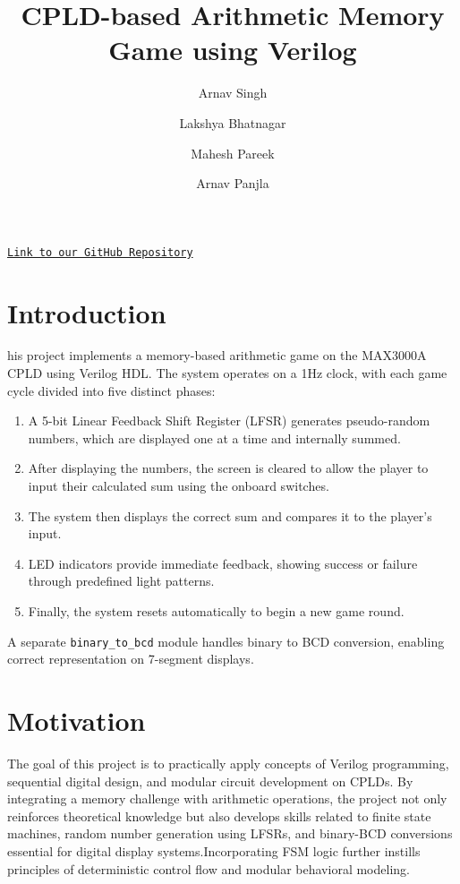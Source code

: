 \documentclass[10pt,a4paper,twocolumn,twoside]{tau-class/tau}
\title{CPLD-based Arithmetic Memory Game using Verilog}
\author[a]{Arnav Singh}
\author[b]{Lakshya Bhatnagar}
\author[c]{Mahesh Pareek}
\author[d]{Arnav Panjla}
\affil[a]{Arnav Singh, 2023EE10968}
\affil[b]{Lakshya Bhatnagar, 2023AM10945}
\affil[c]{Mahesh Pareek, 2023MT10586}
\affil[d]{Arnav Panjla, 2023EE10978}
\begin{document}
		
    \maketitle 
    \thispagestyle{firststyle} 
    \tauabstract 
    
\noindent\hfill \href{https://github.com/Arnav-panjla/CPLD_meth_game}{\texttt{Link to our GitHub Repository}}

\section{Introduction}

    his project implements a memory-based arithmetic game on the MAX3000A CPLD using Verilog HDL. The system operates on a 1Hz clock, with each game cycle divided into five distinct phases:
    
    \begin{enumerate}
        \item A 5-bit Linear Feedback Shift Register (LFSR) generates pseudo-random numbers, which are displayed one at a time and internally summed.
        \item After displaying the numbers, the screen is cleared to allow the player to input their calculated sum using the onboard switches.
        \item The system then displays the correct sum and compares it to the player's input.
        \item LED indicators provide immediate feedback, showing success or failure through predefined light patterns.
        \item Finally, the system resets automatically to begin a new game round.
    \end{enumerate}

A separate \texttt{binary\_to\_bcd} module handles binary to BCD conversion, enabling correct representation on 7-segment displays.
	
\section{Motivation}

    The goal of this project is to practically apply concepts of Verilog programming, sequential digital design, and modular circuit development on CPLDs. By integrating a memory challenge with arithmetic operations, the project not only reinforces theoretical knowledge but also develops skills related to finite state machines, random number generation using LFSRs, and binary-BCD conversions essential for digital display systems.Incorporating FSM logic further instills principles of deterministic control flow and modular behavioral modeling.
    
\end{document}
